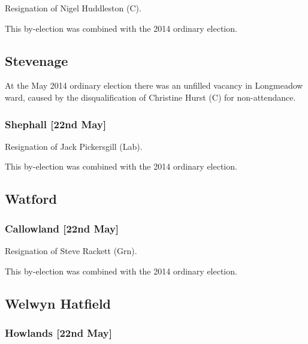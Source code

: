 \documentclass[a4paper,openany]{book}
\begin{document}
\begin{results}

Resignation of Nigel Huddleston (C).

This by-election was combined with the 2014 ordinary election.

\subsection*{Stevenage}

At the May 2014 ordinary election there was an unfilled vacancy in Longmeadow ward, caused by the disqualification of Christine Hurst (C) for non-attendance.

\subsubsection*{Shephall \hspace*{\fill}\nolinebreak[1]%
\enspace\hspace*{\fill}
[22nd May]}


Resignation of Jack Pickersgill (Lab).

This by-election was combined with the 2014 ordinary election.

\subsection*{Watford}

\subsubsection*{Callowland \hspace*{\fill}\nolinebreak[1]%
\enspace\hspace*{\fill}
[22nd May]}


Resignation of Steve Rackett (Grn).

This by-election was combined with the 2014 ordinary election.

\subsection*{Welwyn Hatfield}

\subsubsection*{Howlands \hspace*{\fill}\nolinebreak[1]%
\enspace\hspace*{\fill}
[22nd May]}


\end{results}
\end{document}

